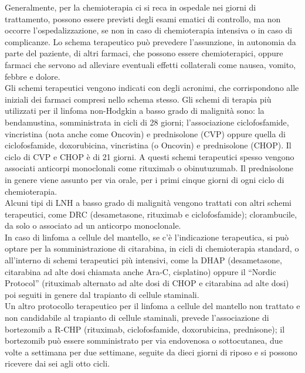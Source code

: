 Generalmente, per la chemioterapia ci si reca in ospedale nei giorni di trattamento, possono essere previsti degli 
esami ematici di controllo, ma non occorre l’ospedalizzazione, se non in caso di chemioterapia intensiva o in caso di 
complicanze. Lo schema terapeutico può prevedere l’assunzione, in autonomia da parte del paziente, di altri farmaci, 
che possono essere chemioterapici, oppure farmaci che servono ad alleviare eventuali effetti collaterali 
come nausea, vomito, febbre e dolore\cite{LOWGRADE}.\\
Gli schemi terapeutici vengono indicati con degli acronimi, che corrispondono alle iniziali dei farmaci compresi nello 
schema stesso. Gli schemi di terapia più utilizzati per il linfoma non-Hodgkin a basso grado di malignità sono: 
la bendamustina, somministrata in cicli di 28 giorni; l’associazione  ciclofosfamide, vincristina (nota anche come 
Oncovin) e prednisolone (CVP) oppure quella di ciclofosfamide, doxorubicina, vincristina (o Oncovin) e prednisolone 
(CHOP). Il ciclo di CVP e CHOP è di 21 giorni. A questi schemi terapeutici spesso vengono associati anticorpi 
monoclonali come rituximab o obinutuzumab. Il prednisolone in genere viene assunto per via orale, per i primi cinque 
giorni di ogni ciclo di chemioterapia.\\
Alcuni tipi di LNH a basso grado di malignità vengono trattati con altri schemi terapeutici, come DRC 
(desametasone, rituximab e ciclofosfamide); clorambucile, da solo o associato ad un anticorpo monoclonale\cite{LOWGRADE}.\\
In caso di linfoma a cellule del mantello, se c’è l’indicazione terapeutica, si può optare per la somministrazione di 
citarabina, in cicli di chemioterapia standard, o all’interno di schemi terapeutici più intensivi, come la  DHAP 
(desametasone, citarabina ad alte dosi chiamata anche Ara-C, cisplatino) oppure il “Nordic Protocol” (rituximab 
alternato ad alte dosi di CHOP e citarabina ad alte dosi) poi seguiti in genere dal trapianto di cellule 
staminali\cite{LOWGRADE}.\\
Un altro protocollo terapeutico per il linfoma a cellule del mantello non trattato e non candidabile al trapianto di 
cellule staminali, prevede l’associazione di bortezomib a R-CHP (rituximab, ciclofosfamide, doxorubicina, prednisone); 
il bortezomib può essere somministrato per via endovenosa o sottocutanea, due volte a settimana per due settimane, 
seguite da dieci giorni di riposo e si possono ricevere dai sei agli otto cicli\cite{LOWGRADE}.\\ 

